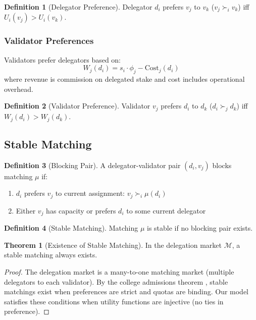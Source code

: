 \documentclass[11pt,a4paper]{article}
\theoremstyle{definition}
\newtheorem{definition}{Definition}[section]
\newtheorem{theorem}{Theorem}[section]
\theoremstyle{remark}
\begin{document}
\begin{definition}[Delegator Preference]
Delegator $d_i$ prefers $v_j$ to $v_k$ ($v_j \succ_i v_k$) iff $U_i(v_j) > U_i(v_k)$.
\end{definition}

\subsubsection{Validator Preferences}

Validators prefer delegators based on:
\begin{equation}
    W_j(d_i) = s_i \cdot \phi_j - \text{Cost}_j(d_i)
\end{equation}
where revenue is commission on delegated stake and cost includes operational overhead.

\begin{definition}[Validator Preference]
Validator $v_j$ prefers $d_i$ to $d_k$ ($d_i \succ_j d_k$) iff $W_j(d_i) > W_j(d_k)$.
\end{definition}

\subsection{Stable Matching}

\begin{definition}[Blocking Pair]
A delegator-validator pair $(d_i, v_j)$ blocks matching $\mu$ if:
\begin{enumerate}
    \item $d_i$ prefers $v_j$ to current assignment: $v_j \succ_i \mu(d_i)$
    \item Either $v_j$ has capacity or prefers $d_i$ to some current delegator
\end{enumerate}
\end{definition}

\begin{definition}[Stable Matching]
Matching $\mu$ is stable if no blocking pair exists.
\end{definition}

\begin{theorem}[Existence of Stable Matching]
In the delegation market $\mathcal{M}$, a stable matching always exists.
\end{theorem}

\begin{proof}
The delegation market is a many-to-one matching market (multiple delegators to each validator). By the college admissions theorem \cite{gale1962college}, stable matchings exist when preferences are strict and quotas are binding. Our model satisfies these conditions when utility functions are injective (no ties in preference).
\end{proof}
\end{document}
